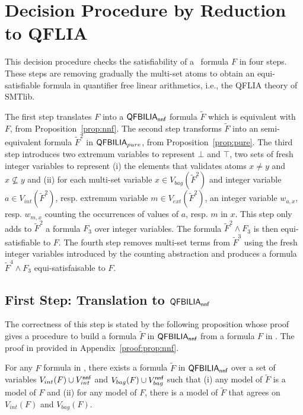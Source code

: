 
\section{Decision Procedure by Reduction to QFLIA}
\label{sec:fsimple}

This decision procedure checks the satisfiability of a \QFBILIA\ formula $F$ in four steps.
These steps are removing gradually the multi-set atoms to obtain an equi-satisfiable formula in quantifier free linear arithmetics, i.e., the QFLIA theory of SMTlib.

The first step translates $F$ into a $\textsf{QFBILIA}_{\textsf{nnf}}$ formula $\tilde{F}$ which is equivalent with $F$, from  Proposition~\ref{prop:nnf}.
The second step transforms $\tilde{F}$ into an semi-equivalent formula $\tilde{F}^2$ in $\textsf{QFBILIA}_{pure}$, from  Proposition~\ref{prop:pure}.
The third step introduces two extremum variables to represent $\bot$ and $\top$, two sets of fresh integer variables to represent
(i) the elements that validates atoms $x\neq y$ and $x\nsubseteq y$ and
(ii) for each multi-set variable $x\in V_{bag}(\tilde{F}^2)$ and integer variable $a\in V_{int}(\tilde{F}^2)$, resp. extremum variable $m\in V_{ext}(\tilde{F}^2)$,
 an integer variable $w_{a,x}$, resp. $w_{m,x}$ counting the occurrences of values of $a$, resp. $m$ in $x$.
This step only adds to $\tilde{F}^2$ a formula $F_3$ over integer variables. The formula $\tilde{F}^2 \land F_3$ is then equi-satisfiable to $F$.
The fourth step removes multi-set terms from $\tilde{F}^3$ using the fresh integer variables introduced by the counting abstraction and produces a formula $\tilde{F}^4 \land F_3$ equi-satisfaisable to $F$.



\subsection{First Step: Translation to $\textsf{QFBILIA}_{\textsf{nnf}}$}
\label{ssec:dp-s1}

The correctness of this step is stated by the following proposition whose proof gives a procedure to build a formula $\tilde{F}$ in $\textsf{QFBILIA}_{\textsf{nnf}}$ from a formula $F$ in \QFBILIA. The proof in provided in Appendix~\ref{proof:prop:nnf}.

\begin{myprop}
\label{prop:nnf}
For any $F$ formula in \QFBILIA, there exists a formula $\tilde{F}$ in $\textsf{QFBILIA}_{\textsf{nnf}}$ over a set of variables
$V_{int}(F)\cup V^{\textsf{nnf}}_{int}$ and $V_{bag}(F)\cup V^{\textsf{nnf}}_{bag}$ such that
(i) any model of $\tilde{F}$ is a model of $F$ and
(ii) for any model of $F$, there is a model of $\tilde{F}$ that agrees on $V_{int}(F)$ and $V_{bag}(F)$.
\end{myprop}

